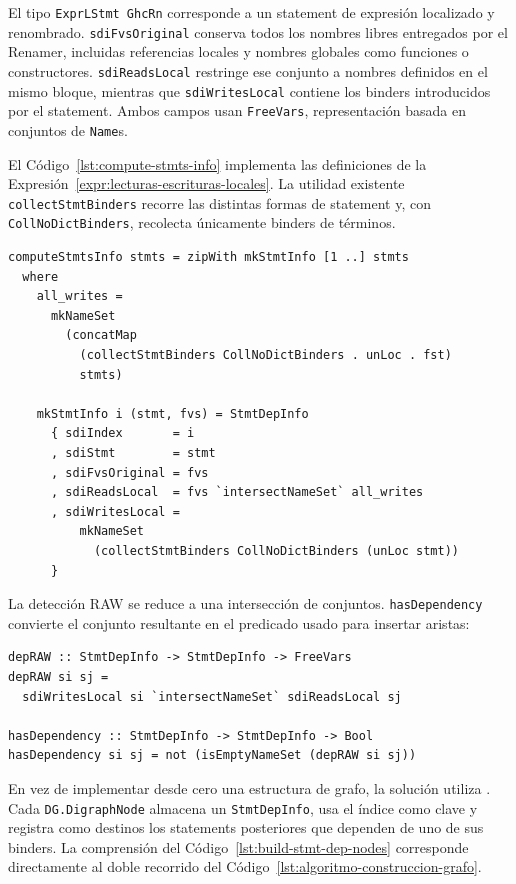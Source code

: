 El tipo \texttt{ExprLStmt GhcRn} corresponde a un statement de expresión localizado y renombrado. \texttt{sdiFvsOriginal} conserva todos los nombres libres entregados por el Renamer, incluidas referencias locales y nombres globales como funciones o constructores. \texttt{sdiReadsLocal} restringe ese conjunto a nombres definidos en el mismo bloque, mientras que \texttt{sdiWritesLocal} contiene los binders introducidos por el statement. Ambos campos usan \texttt{FreeVars}, representación basada en conjuntos de \texttt{Name}s.

El Código~\ref{lst:compute-stmts-info} implementa las definiciones de la Expresión~\ref{expr:lecturas-escrituras-locales}. La utilidad existente \texttt{collectStmtBinders} recorre las distintas formas de statement y, con \texttt{CollNoDictBinders}, recolecta únicamente binders de términos.

\noindent\begin{minipage}{\textwidth}
\begin{lstlisting}[style=haskell,caption={Cálculo de lecturas y escrituras locales en el Renamer.},label={lst:compute-stmts-info}]
computeStmtsInfo stmts = zipWith mkStmtInfo [1 ..] stmts
  where
    all_writes =
      mkNameSet
        (concatMap
          (collectStmtBinders CollNoDictBinders . unLoc . fst)
          stmts)

    mkStmtInfo i (stmt, fvs) = StmtDepInfo
      { sdiIndex       = i
      , sdiStmt        = stmt
      , sdiFvsOriginal = fvs
      , sdiReadsLocal  = fvs `intersectNameSet` all_writes
      , sdiWritesLocal =
          mkNameSet
            (collectStmtBinders CollNoDictBinders (unLoc stmt))
      }
\end{lstlisting}
\end{minipage}

La detección RAW se reduce a una intersección de conjuntos. \texttt{hasDependency} convierte el conjunto resultante en el predicado usado para insertar aristas:

\begin{lstlisting}[style=haskell,caption={Detección de una dependencia RAW entre dos statements.},label={lst:dep-raw}]
depRAW :: StmtDepInfo -> StmtDepInfo -> FreeVars
depRAW si sj =
  sdiWritesLocal si `intersectNameSet` sdiReadsLocal sj

hasDependency :: StmtDepInfo -> StmtDepInfo -> Bool
hasDependency si sj = not (isEmptyNameSet (depRAW si sj))
\end{lstlisting}

En vez de implementar desde cero una estructura de grafo, la solución utiliza . Cada \texttt{DG.DigraphNode} almacena un \texttt{StmtDepInfo}, usa el índice como clave y registra como destinos los statements posteriores que dependen de uno de sus binders. La comprensión del Código~\ref{lst:build-stmt-dep-nodes} corresponde directamente al doble recorrido del Código~\ref{lst:algoritmo-construccion-grafo}.

